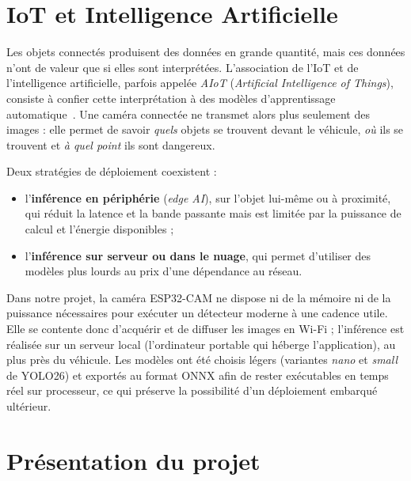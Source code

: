\section{IoT et Intelligence Artificielle}

Les objets connectés produisent des données en grande quantité, mais ces données n'ont de valeur que si elles sont
interprétées. L'association de l'IoT et de l'intelligence artificielle, parfois appelée \emph{AIoT}
(\textit{Artificial Intelligence of Things}), consiste à confier cette interprétation à des modèles
d'apprentissage automatique~\cite{zhang2021aiot}. Une caméra connectée ne transmet alors plus seulement des
images : elle permet de savoir \emph{quels} objets se trouvent devant le véhicule, \emph{où} ils se trouvent et
\emph{à quel point} ils sont dangereux.

Deux stratégies de déploiement coexistent :
\begin{itemize}
  \item l'\textbf{inférence en périphérie} (\textit{edge AI}), sur l'objet lui-même ou à proximité, qui réduit la
        latence et la bande passante mais est limitée par la puissance de calcul et l'énergie disponibles ;
  \item l'\textbf{inférence sur serveur ou dans le nuage}, qui permet d'utiliser des modèles plus lourds au prix
        d'une dépendance au réseau.
\end{itemize}
Dans notre projet, la caméra ESP32-CAM ne dispose ni de la mémoire ni de la puissance nécessaires pour exécuter un
détecteur moderne à une cadence utile. Elle se contente donc d'acquérir et de diffuser les images en Wi-Fi ;
l'inférence est réalisée sur un serveur local (l'ordinateur portable qui héberge l'application), au plus près du
véhicule. Les modèles ont été choisis légers (variantes \emph{nano} et \emph{small} de YOLO26) et exportés au
format ONNX afin de rester exécutables en temps réel sur processeur, ce qui préserve la possibilité d'un
déploiement embarqué ultérieur.

\section{Présentation du projet}

